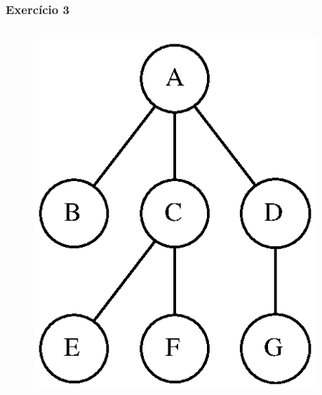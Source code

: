 \documentclass[aspectratio=169]{beamer}
\begin{document}
\begin{frame}[fragile]\frametitle{Exercício 3}
\begin{columns}
\begin{column}{0.23\linewidth}
\begin{figure}[h]
	\centering
	\includegraphics[height=0.4\paperheight]{imagens/arvore_a.eps}
\end{figure}
\end{column}
\begin{column}{0.77\linewidth}
\fontsize{6pt}{6pt}\selectfont{

}
\end{column}
\end{columns}
\end{frame}
\end{document}
